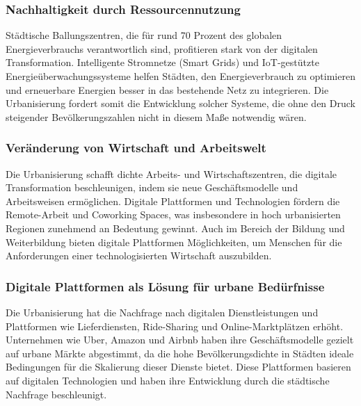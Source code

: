 \documentclass[conference,compsoc,final,a4paper, onecolumn, 11pt]{IEEEtran}
\begin{document}
\subsubsection{Nachhaltigkeit durch Ressourcennutzung}
Städtische Ballungszentren, die für rund 70 Prozent des globalen Energieverbrauchs verantwortlich sind, profitieren stark von der digitalen Transformation. 
Intelligente Stromnetze (Smart Grids) und \ac{IoT}-gestützte Energieüberwachungssysteme helfen Städten, den Energieverbrauch zu optimieren und erneuerbare Energien besser in das bestehende Netz zu integrieren.
Die Urbanisierung fordert somit die Entwicklung solcher Systeme, die ohne den Druck steigender Bevölkerungszahlen nicht in diesem Maße notwendig wären.\autocite{mdpi_smart_cities_iot}
 

\subsubsection{Veränderung von Wirtschaft und Arbeitswelt}
Die Urbanisierung schafft dichte Arbeits- und Wirtschaftszentren, die digitale Transformation beschleunigen, indem sie neue Geschäftsmodelle und Arbeitsweisen ermöglichen.
Digitale Plattformen und Technologien fördern die Remote-Arbeit und Coworking Spaces, was insbesondere in hoch urbanisierten Regionen zunehmend an Bedeutung gewinnt.
Auch im Bereich der Bildung und Weiterbildung bieten digitale Plattformen Möglichkeiten, um Menschen für die Anforderungen einer technologisierten Wirtschaft auszubilden. \autocite{xpert_digital_urbanization}


\subsubsection{Digitale Plattformen als Lösung für urbane Bedürfnisse}
Die Urbanisierung hat die Nachfrage nach digitalen Dienstleistungen und Plattformen wie Lieferdiensten, Ride-Sharing und Online-Marktplätzen erhöht. 
Unternehmen wie Uber, Amazon und Airbnb haben ihre Geschäftsmodelle gezielt auf urbane Märkte abgestimmt, da die hohe Bevölkerungsdichte in Städten ideale Bedingungen für die Skalierung dieser Dienste bietet. 
Diese Plattformen basieren auf digitalen Technologien und haben ihre Entwicklung durch die städtische Nachfrage beschleunigt.\autocite{global_sustainability_gap}
\end{document}
